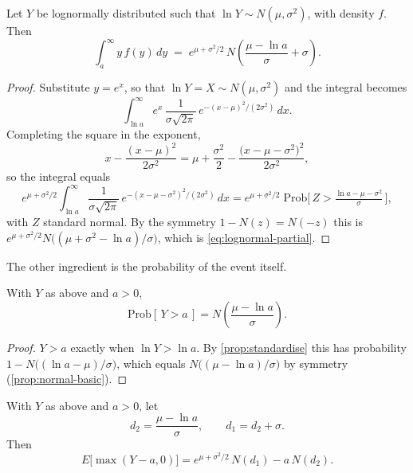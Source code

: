 \begin{theorem}
	Let $Y$ be lognormally distributed such that $\ln Y\sim N(\mu,\sigma^{2})$, with density $f$. Then
	\begin{equation}
		\int_{a}^{\infty} y\,f(y)\,dy
		\;=\; e^{\mu+\sigma^{2}/2}\,N\!\left(\frac{\mu-\ln a}{\sigma}+\sigma\right) . \label{eq:lognormal-partial}
	\end{equation}
\end{theorem}

\suppstart
\begin{proof}
	Substitute $y=e^{x}$, so that $\ln Y = X\sim N(\mu,\sigma^{2})$ and the integral becomes
	\[
		\int_{\ln a}^{\infty} e^{x}\,\frac{1}{\sigma\sqrt{2\pi}}\,e^{-(x-\mu)^{2}/(2\sigma^{2})}\,dx .
	\]
	Completing the square in the exponent,
	\[
		x - \frac{(x-\mu)^{2}}{2\sigma^{2}}
		= \mu + \frac{\sigma^{2}}{2} - \frac{\bigl(x-\mu-\sigma^{2}\bigr)^{2}}{2\sigma^{2}} ,
	\]
	so the integral equals
	\[
		e^{\mu+\sigma^{2}/2}\int_{\ln a}^{\infty}\frac{1}{\sigma\sqrt{2\pi}}\,
		e^{-(x-\mu-\sigma^{2})^{2}/(2\sigma^{2})}\,dx
		= e^{\mu+\sigma^{2}/2}\;\mathrm{Prob}\bigl[\,Z > \tfrac{\ln a-\mu-\sigma^{2}}{\sigma}\,\bigr] ,
	\]
	with $Z$ standard normal.
	By the symmetry $1-N(z)=N(-z)$ this is $e^{\mu+\sigma^{2}/2}N\bigl((\mu+\sigma^{2}-\ln a)/\sigma\bigr)$, which is \eqref{eq:lognormal-partial}.
\end{proof}

The other ingredient is the probability of the event itself.

\begin{proposition}\label{prop:lognormal-tail}
	With $Y$ as above and $a>0$,
	\[
		\mathrm{Prob}[\,Y>a\,]=N\!\left(\frac{\mu-\ln a}{\sigma}\right) .
	\]
\end{proposition}

\begin{proof}
	$Y>a$ exactly when $\ln Y>\ln a$.
	By \autoref{prop:standardise} this has probability $1-N\bigl((\ln a-\mu)/\sigma\bigr)$, which equals $N\bigl((\mu-\ln a)/\sigma\bigr)$ by symmetry (\autoref{prop:normal-basic}).
\end{proof}

\begin{corollary}\label{cor:lognormal-call}
	With $Y$ as above and $a>0$, let
	\[
		d_{2}=\frac{\mu-\ln a}{\sigma} ,
		\qquad
		d_{1}=d_{2}+\sigma .
	\]
	Then
	\begin{equation}
		E\bigl[\max(Y-a,0)\bigr]=e^{\mu+\sigma^{2}/2}\,N(d_{1})-a\,N(d_{2}) . \label{eq:lognormal-call}
	\end{equation}
\end{corollary}

